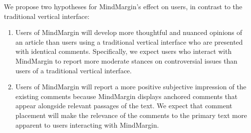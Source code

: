 



We propose two hypotheses for MindMargin's effect on users, in contrast to the traditional vertical interface:
\begin{enumerate}
\item Users of MindMargin will develop more thoughtful and nuanced opinions of an article than users using a traditional vertical interface who are presented with identical comments. %
Specifically, we expect users who interact with MindMargin to report more moderate stances on controversial issues than users of a traditional vertical interface.
\item Users of MindMargin will report a more positive subjective impression of the existing comments because MindMargin displays anchored comments that appear alongside relevant passages of the text. We expect that comment placement will make the relevance of the comments to the primary text more apparent to users interacting with MindMargin.
\end{enumerate}



